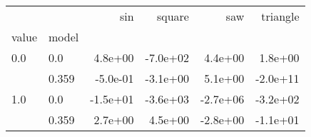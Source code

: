 \begin{tabular}{llrrrr}
\toprule
    &       &      sin &   square &      saw &  triangle \\
value & model &          &          &          &           \\
\midrule
0.0 & 0.0 &  4.8e+00 & -7.0e+02 &  4.4e+00 &   1.8e+00 \\
    & 0.359 & -5.0e-01 & -3.1e+00 &  5.1e+00 &  -2.0e+11 \\
1.0 & 0.0 & -1.5e+01 & -3.6e+03 & -2.7e+06 &  -3.2e+02 \\
    & 0.359 &  2.7e+00 &  4.5e+00 & -2.8e+00 &  -1.1e+01 \\
\bottomrule
\end{tabular}
